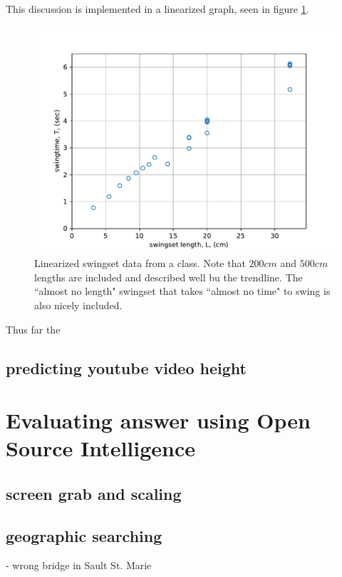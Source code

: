 \documentclass[12pt]{iopart}
\begin{document}
This discussion is implemented in a linearized graph, seen in figure \ref{linearized_swingtime_graph}. 

\begin{figure}[h]
\centering
	\includegraphics[width=\columnwidth]{linearized_swingtime_graph.pdf}
\caption{
	Linearized swingset data from a class.  Note that $200cm$ and $500cm$ lengths are included and described well bu the trendline.  The ``almost no length" swingset that takes ``almost no time" to swing is also nicely included.   
	}
	\label{linearized_swingtime_graph}
\end{figure}


Thus far the 

\subsection{predicting youtube video height}


\section{Evaluating answer using Open Source Intelligence}

\subsection{screen grab and scaling}

\subsection{geographic searching}
- wrong bridge in Sault St. Marie
\end{document}
